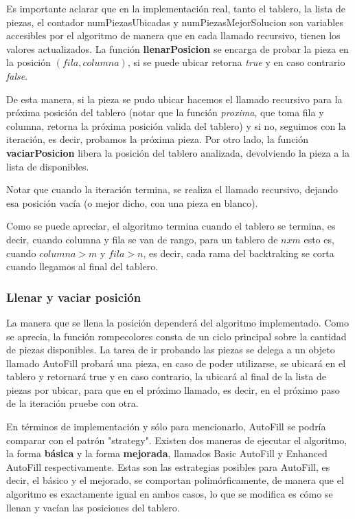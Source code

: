 \documentclass[11pt,a4paper]{article}
\begin{document}
Es importante aclarar que en la implementación real, tanto el tablero, la lista de piezas, el contador numPiezasUbicadas y numPiezasMejorSolucion son variables accesibles por el algoritmo de manera que en cada llamado recursivo, tienen los valores actualizados.
La función \textbf{llenarPosicion} se encarga de probar la pieza en la posición $(fila, columna)$, si se puede ubicar retorna \textit{true} y en caso contrario \textit{false}.

De esta manera, si la pieza se pudo ubicar hacemos el llamado recursivo para la próxima posición del tablero (notar que la función \textit{proxima}, que toma fila y columna, retorna la próxima posición valida del tablero) y si no, seguimos con la iteración, es decir, probamos la próxima pieza.
Por otro lado, la función \textbf{vaciarPosicion} libera la posición del tablero analizada, devolviendo la pieza a la lista de disponibles.

Notar que cuando la iteración termina, se realiza el llamado recursivo, dejando esa posición vacía (o mejor dicho, con una pieza en blanco).

Como se puede apreciar, el algoritmo termina cuando el tablero se termina, es decir, cuando columna y fila se van de rango, para un tablero de $nxm$ esto es, cuando $columna > m$ y $fila > n$, es decir, cada rama del backtraking se corta cuando llegamos al final del tablero.

\subsubsection*{Llenar y vaciar posición}
La manera que se llena la posición dependerá del algoritmo implementado. Como se aprecia, la función rompecolores consta de un ciclo principal sobre la cantidad de piezas disponibles. La tarea de ir probando las piezas se delega a un objeto llamado AutoFill  probará una pieza, en caso de poder utilizarse, se ubicará en el tablero y retornará true y en caso contrario, la ubicará al final de la lista de piezas por ubicar, para que en el próximo llamado, es decir, en el próximo paso de la iteración pruebe con otra.

En términos de implementación y sólo para mencionarlo, AutoFill se podría comparar con el patrón "strategy". Existen dos maneras de ejecutar el algoritmo, la forma \textbf{básica} y la forma \textbf{mejorada}, llamados Basic AutoFill y Enhanced AutoFill respectivamente. Estas son las estrategias posibles para AutoFill, es decir, el básico y el mejorado, se comportan polimórficamente, de manera que el algoritmo es exactamente igual en ambos casos, lo que se modifica es cómo se llenan y vacían las posiciones del tablero.
\end{document}
